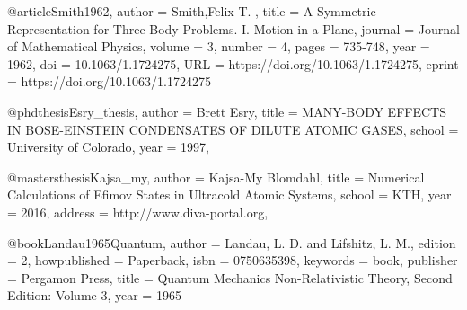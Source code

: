 @article{Smith1962,
	author = {Smith,Felix T. },
	title = {A Symmetric Representation for Three Body Problems. I. Motion in a Plane},
	journal = {Journal of Mathematical Physics},
	volume = {3},
	number = {4},
	pages = {735-748},
	year = {1962},
	doi = {10.1063/1.1724275},
	URL = {https://doi.org/10.1063/1.1724275},
	eprint = {https://doi.org/10.1063/1.1724275}
	}

@phdthesis{Esry_thesis,
	author       = {Brett Esry}, 
	title        = {MANY-BODY EFFECTS IN BOSE-EINSTEIN CONDENSATES
	OF DILUTE ATOMIC GASES},
	school       = {University of Colorado},
	year         = 1997,
	}

@mastersthesis{Kajsa_my,
	author       = {Kajsa-My Blomdahl}, 
	title        = {Numerical Calculations of Efimov States in Ultracold Atomic Systems},
	school       = {KTH},
	year         = 2016,
	address      = {http://www.diva-portal.org},
}

@book{Landau1965Quantum,
	author = {Landau, L. D. and Lifshitz, L. M.},
	edition = 2,
	howpublished = {Paperback},
	isbn = {0750635398},
	keywords = {book},
	publisher = {Pergamon Press},
	title = {Quantum Mechanics Non-Relativistic Theory, Second Edition: Volume 3},
	year = 1965
}

